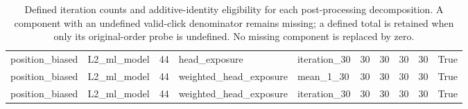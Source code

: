 \begin{table}[htbp!]
\begin{tabular}{llrllrrrrr}
position\_biased & L2\_ml\_model & 44 & head\_exposure & iteration\_30 & 30 & 30 & 30 & 30 & True \\
position\_biased & L2\_ml\_model & 44 & weighted\_head\_exposure & mean\_1\_30 & 30 & 30 & 30 & 30 & True \\
position\_biased & L2\_ml\_model & 44 & weighted\_head\_exposure & iteration\_30 & 30 & 30 & 30 & 30 & True \\
\hline
\end{tabular}
\caption{Defined iteration counts and additive-identity eligibility for each post-processing decomposition. A component with an undefined valid-click denominator remains missing; a defined total is retained when only its original-order probe is undefined. No missing component is replaced by zero.}
\label{chap:results:tab:rq4_post_processing_component_eligibility}
\end{table}
